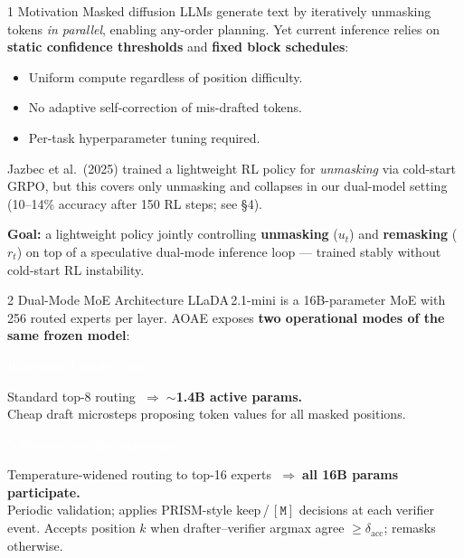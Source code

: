 \documentclass[final]{beamer}
\newcommand{\namedpara}[3]{%
  \par\vspace{4pt}%
  \noindent\colorbox{#1}{\parbox{\dimexpr\linewidth-2\fboxsep}{\textcolor{white}{\bfseries\large\strut #2}}}%
  \par\vspace{2pt}%
  \noindent\colorbox{#1!20!white}{\parbox{\dimexpr\linewidth-2\fboxsep}{\vspace{3pt}#3\vspace{3pt}}}%
  \par\vspace{6pt}%
}
\newlength{\colwidth} \setlength{\colwidth}{0.306\paperwidth}
\newcommand{\mask}{\ensuremath{\mathtt{[M]}}}
\begin{document}
\begin{frame}[t]
\vspace{0.9cm}
\begin{columns}[t]

\begin{column}{\colwidth}

\begin{block}{1 \quad Motivation}
Masked diffusion LLMs generate text by iteratively unmasking tokens
\emph{in parallel}, enabling any-order planning.
Yet current inference relies on \textbf{static confidence thresholds}
and \textbf{fixed block schedules}:
\begin{itemize}\itemsep3pt
  \item Uniform compute regardless of position difficulty.
  \item No adaptive self-correction of mis-drafted tokens.
  \item Per-task hyperparameter tuning required.
\end{itemize}

\medskip
Jazbec et al.\ (2025) trained a lightweight RL policy for \emph{unmasking}
via cold-start GRPO, but this covers only unmasking and collapses in our
dual-model setting (10--14\% accuracy after 150 RL steps; see \S4).

\medskip\noindent
\textbf{Goal:} a lightweight policy jointly controlling \textbf{unmasking}
($u_t$) and \textbf{remasking} ($r_t$) on top of a speculative dual-mode
inference loop — trained stably without cold-start RL instability.
\end{block}

\begin{block}{2 \quad Dual-Mode MoE Architecture}
LLaDA\,2.1-mini is a 16B-parameter MoE with 256 routed experts per layer.
AOAE exposes \textbf{two operational modes of the same frozen model}:

\bigskip
\namedpara{primaryblue}{Hard-routed drafter (fast)}{%
  Standard top-8 routing
  $\;\Rightarrow\;${\bfseries ${\sim}$1.4B active params.}\\[4pt]
  Cheap draft microsteps proposing token values for all masked positions.
}

\namedpara{accentred}{Soft-routed verifier (expressive)}{%
  Temperature-widened routing to top-16 experts
  $\;\Rightarrow\;${\bfseries all 16B params participate.}\\[4pt]
  Periodic validation; applies PRISM-style keep\,/\,$\mask$ decisions
  at each verifier event.
  Accepts position $k$ when drafter--verifier argmax agree
  $\ge\delta_{\mathrm{acc}}$; remasks otherwise.
}


\end{block}
\end{column}
\end{columns}
\end{frame}
\end{document}
